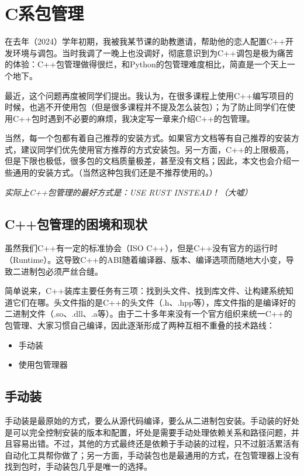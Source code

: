 \documentclass[../main]{subfiles}
\begin{document}
\chapter{C系包管理}

在去年（2024）学年初期，我被我某节课的助教邀请，帮助他的恋人配置C++开发环境与调包。当时我调了一晚上也没调好，彻底意识到为C++调包是极为痛苦的体验：C++包管理做得很烂，和Python的包管理难度相比，简直是一个天上一个地下。

最近，这个问题再度被同学们提出。我认为，在很多课程上使用C++编写项目的时候，也逃不开使用包（但是很多课程并不提及怎么装包）；为了防止同学们在使用C++包时遇到不必要的麻烦，我决定写一章来介绍C++的包管理。

当然，每一个包都有着自己推荐的安装方式。如果官方文档等有自己推荐的安装方式，建议同学们优先使用官方推荐的方式安装包。另一方面，C++的上限极高，但是下限也极低，很多包的文档质量极差，甚至没有文档；因此，本文也会介绍一些通用的安装方式。（当然这种包我们还是不推荐使用的。）

\emph{实际上C++包管理的最好方式是：USE RUST INSTEAD！（大嘘）}

\section{C++包管理的困境和现状}

虽然我们C++有一定的标准协会（ISO C++），但是C++没有官方的运行时（Runtime）。这导致C++的ABI随着编译器、版本、编译选项而随地大小变，导致二进制包必须严丝合缝。

简单说来，C++装库主要任务有三项：找到头文件、找到库文件、让构建系统知道它们在哪。头文件指的是C++的头文件（.h、.hpp等），库文件指的是编译好的二进制文件（.so、.dll、.a等）。由于二十多年来没有一个官方组织来统一C++的包管理、大家习惯自己编译，因此逐渐形成了两种互相不重叠的技术路线：
\begin{itemize}
    \item 手动装
    \item 使用包管理器
\end{itemize}

\section{手动装}

手动装是最原始的方式，要么从源代码编译，要么从二进制包安装。手动装的好处是可以完全控制安装的版本和配置，坏处是需要手动处理依赖关系和路径问题，并且容易出错。不过，其他的方式最终还是依赖于手动装的过程，只不过脏活累活有自动化工具帮你做了；另一方面，手动装包也是最通用的方式，在包管理器上没有找到包时，手动装包几乎是唯一的选择。
\end{document}
